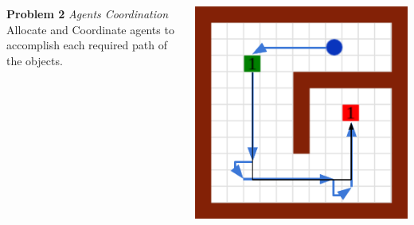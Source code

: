 \documentclass{beamer}
\begin{document}
{\begin{columns}[c]
\begin{column}{0.7\textwidth}
            \textbf{Problem 2} \textit{Agents Coordination}
            \vspace{0.2cm}\\
            Allocate and Coordinate agents to accomplish each required path of the objects.


          \end{column}
          \begin{column}{0.3\textwidth}
            \includegraphics[width=\textwidth]{imgs/MoveIntro_2.pdf}
          \end{column}
        \end{columns}




    }
\end{document}
